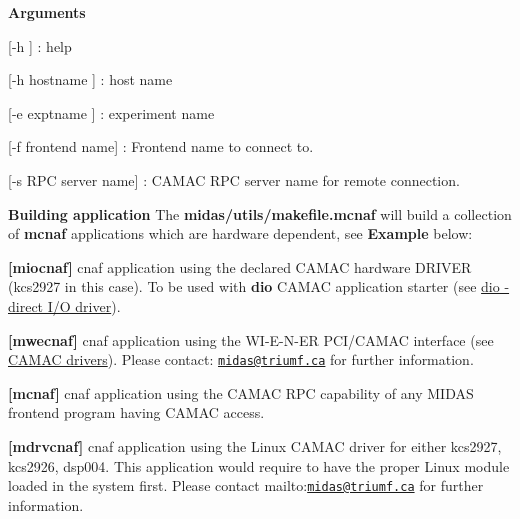 \begin{DoxyItemize}
\item {\bfseries  Arguments }
\begin{DoxyItemize}
\item \mbox{[}-\/h \mbox{]} : help
\item \mbox{[}-\/h hostname \mbox{]} : host name
\item \mbox{[}-\/e exptname \mbox{]} : experiment name
\item \mbox{[}-\/f frontend name\mbox{]} : Frontend name to connect to.
\item \mbox{[}-\/s RPC server name\mbox{]} : CAMAC RPC server name for remote connection.
\end{DoxyItemize}
\end{DoxyItemize}


\begin{DoxyItemize}
\item {\bfseries  Building application } The {\bfseries midas/utils/makefile.mcnaf} will build a collection of {\bfseries mcnaf} applications which are hardware dependent, see {\bfseries  Example } below:
\begin{DoxyItemize}
\item {\bfseries \mbox{[}miocnaf\mbox{]}} cnaf application using the declared CAMAC hardware DRIVER (kcs2927 in this case). To be used with {\bfseries dio} CAMAC application starter (see \hyperlink{FE_utils_FE_dio_utility}{dio -\/ direct I/O driver}).
\item {\bfseries \mbox{[}mwecnaf\mbox{]}} cnaf application using the WI-\/E-\/N-\/ER PCI/CAMAC interface (see \hyperlink{FE_Hardware_CAMAC_drivers}{CAMAC drivers}). Please contact: \href{mailto:midas@triumf.ca}{\tt midas@triumf.ca} for further information.
\item {\bfseries \mbox{[}mcnaf\mbox{]}} cnaf application using the CAMAC RPC capability of any MIDAS frontend program having CAMAC access.
\item {\bfseries \mbox{[}mdrvcnaf\mbox{]}} cnaf application using the Linux CAMAC driver for either kcs2927, kcs2926, dsp004. This application would require to have the proper Linux module loaded in the system first. Please contact mailto:\href{mailto:midas@triumf.ca}{\tt midas@triumf.ca} for further information.
\end{DoxyItemize}
\end{DoxyItemize}



